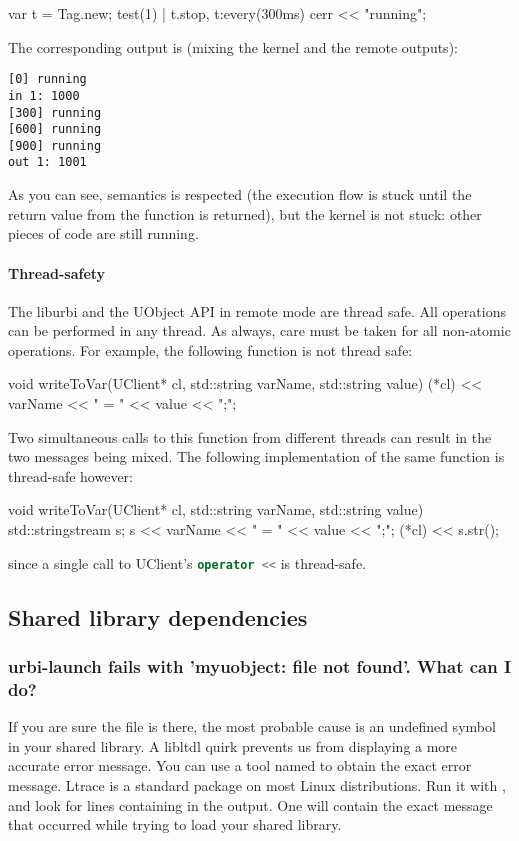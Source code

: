 \begin{urbiunchecked}
var t = Tag.new;
test(1) | t.stop,
t:every(300ms)
  cerr << "running";
\end{urbiunchecked}

The corresponding output is (mixing the kernel and the remote outputs):

\begin{lstlisting}
[0] running
in 1: 1000
[300] running
[600] running
[900] running
out 1: 1001
\end{lstlisting}

As you can see, \urbi semantics is respected (the execution flow is
stuck until the return value from the function is returned), but the
kernel is not stuck: other pieces of code are still running.

\paragraph{Thread-safety}

The liburbi and the UObject API in remote mode are thread safe. All
operations can be performed in any thread. As always, care must be
taken for all non-atomic operations. For example, the following
function is not thread safe:

\begin{cxx}
void
writeToVar(UClient* cl, std::string varName, std::string value)
{
  (*cl) << varName << " = " << value << ";";
}
\end{cxx}

Two simultaneous calls to this function from different threads can
result in the two messages being mixed.  The following implementation
of the same function is thread-safe however:

\begin{cxx}
void
writeToVar(UClient* cl, std::string varName, std::string value)
{
  std::stringstream s;
  s << varName << " = " << value << ";";
  (*cl) << s.str();
}
\end{cxx}

\noindent
since a single call to UClient's \lstinline[language=C++]|operator <<|
is thread-safe.


\subsection{Shared library dependencies}
\subsubsection{urbi-launch fails with 'myuobject: file not found'. What can I do?}
If you are sure the file is there, the most probable cause is an
undefined symbol in your shared library. A libltdl quirk prevents us
from displaying a more accurate error message.  You can use a tool
named  to obtain the exact error message.  Ltrace is a
standard package on most Linux distributions.  Run it with
, and look for lines
containing  in the output. One will contain the exact
message that occurred while trying to load your shared library.

